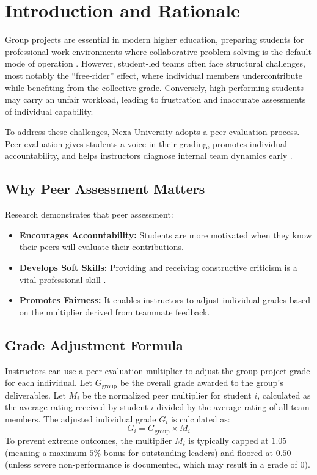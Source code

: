 \section{Introduction and Rationale}

Group projects are essential in modern higher education, preparing students for professional work environments where collaborative problem-solving is the default mode of operation \citep{oakley2004turning}. However, student-led teams often face structural challenges, most notably the ``free-rider'' effect, where individual members undercontribute while benefiting from the collective grade. Conversely, high-performing students may carry an unfair workload, leading to frustration and inaccurate assessments of individual capability.

To address these challenges, Nexa University adopts a peer-evaluation process. Peer evaluation gives students a voice in their grading, promotes individual accountability, and helps instructors diagnose internal team dynamics early \citep{kaufman2000peer}. 

\subsection{Why Peer Assessment Matters}
Research demonstrates that peer assessment:
\begin{itemize}
    \item \textbf{Encourages Accountability:} Students are more motivated when they know their peers will evaluate their contributions.
    \item \textbf{Develops Soft Skills:} Providing and receiving constructive criticism is a vital professional skill \citep{goldfinch1996peer}.
    \item \textbf{Promotes Fairness:} It enables instructors to adjust individual grades based on the multiplier derived from teammate feedback.
\end{itemize}

\subsection{Grade Adjustment Formula}
Instructors can use a peer-evaluation multiplier to adjust the group project grade for each individual. Let $G_{\text{group}}$ be the overall grade awarded to the group's deliverables. Let $M_i$ be the normalized peer multiplier for student $i$, calculated as the average rating received by student $i$ divided by the average rating of all team members. The adjusted individual grade $G_i$ is calculated as:
\begin{equation}
    G_i = G_{\text{group}} \times M_i
\end{equation}
To prevent extreme outcomes, the multiplier $M_i$ is typically capped at $1.05$ (meaning a maximum $5\%$ bonus for outstanding leaders) and floored at $0.50$ (unless severe non-performance is documented, which may result in a grade of $0$).
